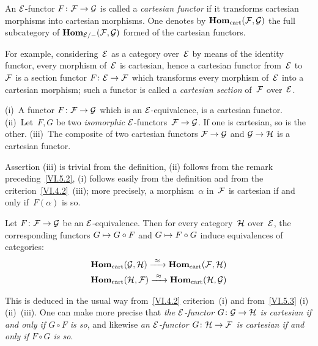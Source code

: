 \begin{definition}
\label{VI.5.2} An $\cal{E}$-functor $F\colon \cal{F}\to\cal{G}$ is
called a \emph{cartesian functor}
if it transforms cartesian morphisms into cartesian
morphisms. One denotes by $\SheafHom_\cart(\cal{F},\cal{G})$
the full subcategory of
$\SheafHom_{\cal{E}/-}(\cal{F},\cal{G})$ formed of the
cartesian functors.

For example, considering~$\cal{E}$ as a category
over~$\cal{E}$ by means of the identity functor, every morphism
of~$\cal{E}$ is cartesian, hence a cartesian functor
from~$\cal{E}$ to~$\cal{F}$ is a section functor $F\colon
\cal{E}\to\cal{F}$ which transforms every morphism of~$\cal{E}$ into a
cartesian morphism; such a functor is called a \emph{cartesian
section} of~$\cal{F}$ over~$\cal{E}$.
\end{definition}

\begin{proposition}
\label{VI.5.3} \textup{(i)}~A functor $F\colon \cal{F} \to \cal{G}$ which is an
$\cal{E}$-equivalence, is a cartesian functor.
\textup{(ii)}~Let~$F,G$ be two \emph{isomorphic} $\cal{E}$-functors~$\cal{F}\to\cal{G}$. If one is cartesian,
so is the other. \textup{(iii)}~The composite of two cartesian functors
$\cal{F}\to\cal{G}$ and $\cal{G}\to\cal{H}$ is a
cartesian functor.
\end{proposition}

Assertion (iii) is trivial from the definition, (ii)
follows from the remark preceding~\ref{VI.5.2}, (i) follows
easily from the definition and from the criterion~\ref{VI.4.2}~(iii); more
precisely, a morphism~$\alpha$ in~$\cal{F}$ is
cartesian if and only if~$F(\alpha)$ is so.

\begin{corollary}
\label{VI.5.4}
Let $F \colon \cal{F} \to \cal{G}$ be an
$\cal{E}$-equivalence. Then for every category~$\cal{H}$
over~$\cal{E}$, the corresponding functors $G \mto G \circ F$ and
$G \mto F \circ G$ induce equivalences of
categories:
\begin{eqnarray*}
\SheafHom_\cart(\cal{G},\cal{H})\lto{\approx}
\SheafHom_\cart(\cal{F},\cal{H}) \\
\SheafHom_\cart(\cal{H},\cal{F})\lto{\approx}
\SheafHom_\cart(\cal{H}, \cal{G})
\end{eqnarray*}
\end{corollary}

This is deduced in the usual way from~\ref{VI.4.2}
criterion~(i) and from~\ref{VI.5.3} (i) (ii)~(iii).
One can make more precise that \emph{the $\cal{E}$-functor
$G\colon \cal{G} \to \cal{H}$ is cartesian if and only if $G
\circ F$ is so}, and likewise \emph{an $\cal{E}$-functor $G\colon
\cal{H} \to \cal{F}$ is cartesian if and only if $F \circ G$
is so}.

